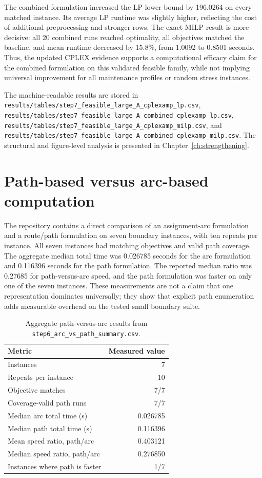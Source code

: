The combined formulation increased the LP lower bound by 196.0264 on every
matched instance. Its average LP runtime was slightly higher, reflecting the
cost of additional preprocessing and stronger rows. The exact MILP result is
more decisive: all 20 combined runs reached optimality, all objectives matched
the baseline, and mean runtime decreased by 15.8\%, from 1.0092 to 0.8501
seconds. Thus, the updated CPLEX evidence supports a computational efficacy
claim for the combined formulation on this validated feasible family, while
not implying universal improvement for all maintenance profiles or random
stress instances.

The machine-readable results are stored in
\texttt{results/tables/step7\_feasible\_large\_A\_cplexamp\_lp.csv},
\texttt{results/tables/step7\_feasible\_large\_A\_combined\_cplexamp\_lp.csv},
\texttt{results/tables/step7\_feasible\_large\_A\_cplexamp\_milp.csv}, and
\texttt{results/tables/step7\_feasible\_large\_A\_combined\_cplexamp\_milp.csv}.
The structural and figure-level analysis is presented in Chapter~\ref{ch:strengthening}.

\section{Path-based versus arc-based computation}
\label{sec:computational_path_arc}

The repository contains a direct comparison of an assignment-arc formulation
and a route/path formulation on seven boundary instances, with ten repeats per
instance. All seven instances had matching objectives and valid path coverage.
The aggregate median total time was 0.026785 seconds for the arc formulation
and 0.116396 seconds for the path formulation. The reported median ratio was
0.27685 for path-versus-arc speed, and the path formulation was
faster on only one of the seven instances. These measurements are not a claim
that one representation dominates universally; they show that explicit path
enumeration adds measurable overhead on the tested small boundary suite.

\begin{table}[t]
\centering\small
\caption{Aggregate path-versus-arc results from
\texttt{step6\_arc\_vs\_path\_summary.csv}.}
\label{tab:path_arc_aggregate}
\begin{tabular}{lr}
\toprule
Metric & Measured value \\
\midrule
Instances & 7 \\
Repeats per instance & 10 \\
Objective matches & 7/7 \\
Coverage-valid path runs & 7/7 \\
Median arc total time (s) & 0.026785 \\
Median path total time (s) & 0.116396 \\
Mean speed ratio, path/arc & 0.403121 \\
Median speed ratio, path/arc & 0.276850 \\
Instances where path is faster & 1/7 \\
\bottomrule
\end{tabular}
\end{table}

